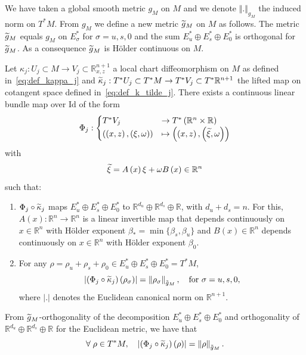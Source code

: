 \documentclass[AHL,Unicode,longabstracts,published]{cedram}
\newcommand{\Id}{\mathrm{Id}}
\newcommand{\bbR}{\mathbb{R}}
\let\oldtilde\tilde
\renewcommand*{\tilde}[1]{\mathchoice{\widetilde{#1}}{\widetilde{#1}}{\oldtilde{#1}}{\oldtilde{#1}}}
\let\oldforall\forall
\renewcommand*{\forall}{\mathrel{\oldforall}}
\newcommand{\bbR}{\mathbb{R}}
\begin{document}
We have taken a global smooth metric $g_{M}$ on $M$ and we denote $\Vert.\Vert _{g_{M}}$ the induced norm on $T^{*}M$. From $g_{M}$ we define a new metric $\tilde{g}_{M}$ on $M$ as follows. The metric $\tilde{g}_{M}$ equals $g_{M}$ on $E_{\sigma}^{*}$ for $\sigma=u,s,0$ and the sum $E_{u}^{*}\oplus E_{s}^{*}\oplus E_{0}^{*}$ is orthogonal for $\tilde{g}_{M}$. As a consequence $\tilde{g}_{M}$ is H\"older continuous on $M$.

Let $\kappa_{j}:U_{j}\subset M\rightarrow V_{j}\subset\bbR_{x,z}^{n+1}$ a local chart diffeomorphism on $M$ as defined in~\eqref{eq:def_kappa_j} and $\tilde{\kappa}_{j}:T^{*}U_{j}\subset T^{*}M\rightarrow T^{*}V_{j}\subset T^{*}\bbR^{n+1}$ the lifted map on cotangent space defined in~\eqref{eq:def_k_tilde_j}. There exists a continuous linear bundle map over $\Id $ of the form
\begin{equation}\label{eq:def_Phi}
\Phi_{j}:
\begin{cases}
T^{*}V_{j} & \rightarrow T^{*}\left(\bbR^{n}\times\bbR\right)\\
\left(\left(x,z\right),\left(\xi,\omega\right)\right) & \mapsto\left(\left(x,z\right),\left(\tilde{\xi},\omega\right)\right)
\end{cases}
\end{equation}
with
\begin{equation}\label{eq:xi_tilde}
\tilde{\xi}=A\left(x\right)\xi+\omega B\left(x\right)\in\bbR^{n}
\end{equation}
such that:
\begin{enumerate}
\item $\Phi_{j}\circ\tilde{\kappa}_{j}$ maps $E_{u}^{*}\oplus E_{s}^{*}\oplus E_{0}^{*}$ to $\bbR^{d_{u}}\oplus\bbR^{d_{s}}\oplus\bbR$, with $d_{u}+d_{s}=n$. For this, $A(x):\bbR^{n}\rightarrow\bbR^{n}$ is a linear invertible map that depends continuously on $x\in\bbR^{n}$ with H\"older exponent $\beta_{*}=\min\{\beta_{s},\beta_{u}\}$ and $B(x)\in\bbR^{n}$ depends continuously on $x\in\bbR^{n}$ with H\"older exponent $\beta_{0}$.
\item For any $\rho=\rho_{u}+\rho_{s}+\rho_{0}\in E_{u}^{*}\oplus E_{s}^{*}\oplus E_{0}^{*}=T^{*}M$,
\begin{equation}\label{eq:prop_Phi}
\left|\left(\Phi_{j}\circ\tilde{\kappa}_{j}\right)\left(\rho_{\sigma}\right)\right|=\left\Vert \rho_{\sigma}\right\Vert _{\tilde{g}_{M}},\quad\text{for }\sigma=u,s,0,
\end{equation}
where $|.|$ denotes the Euclidean canonical norm on $\bbR^{n+1}$.
\end{enumerate}
From $\tilde{g}_{M}$-orthogonality of the decomposition $E_{u}^{*}\oplus E_{s}^{*}\oplus E_{0}^{*}$ and orthogonality of $\bbR^{d_{u}}\oplus\bbR^{d_{s}}\oplus\bbR$ for the Euclidean metric, we have that
\begin{equation}\label{eq:prop_Phi_1}
\forall\rho\in T^{*}M,\quad\left|\left(\Phi_{j}\circ\tilde{\kappa}_{j}\right)\left(\rho\right)\right|=\left\Vert \rho\right\Vert _{\tilde{g}_{M}}.
\end{equation}
\end{document}
